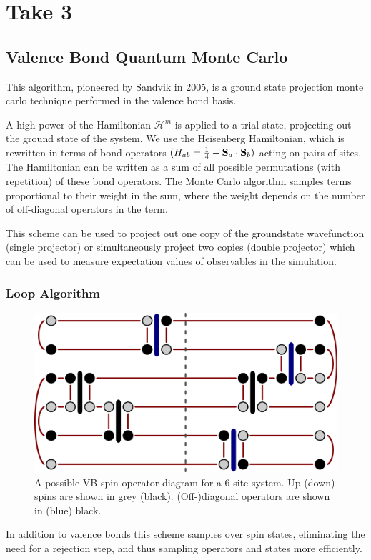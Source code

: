 \documentclass[prb,aps,twocolumn,floatfix,amsmath,amssymb,superscriptaddress,tightenlines]{revtex4}
\begin{document}
\section{Take 3}

\subsection{Valence Bond Quantum Monte Carlo}

This algorithm, pioneered by Sandvik \cite{papers} in 2005, is a ground state projection monte carlo technique performed in the valence bond basis.

A high power of the Hamiltonian $\mathcal{H}^m$ 
is applied to a trial state, projecting out the ground state of the system.
We use the Heisenberg Hamiltonian, which is rewritten in terms of bond operators $(H_{ab} = \tfrac{1}{4} - {\bf S}_a \cdot {\bf S}_b)$ acting on pairs of sites.
The Hamiltonian can be written as a sum of all possible {permutations (with repetition)} of these bond operators.
The Monte Carlo algorithm samples terms proportional to their weight in the sum, where the weight depends on the number of off-diagonal operators in the term.

This scheme can be used to project out one copy of the groundstate wavefunction (single projector) or simultaneously project two copies (double projector) which can be used to measure expectation values of observables in the simulation. 

\subsubsection{Loop Algorithm}

\begin{figure} {
\includegraphics[width=3 in]{loopalg.pdf} \caption{ A possible VB-spin-operator diagram for a 6-site system.
Up (down) spins are shown in grey (black). (Off-)diagonal operators are shown in (blue) black.
\label{loop1} }
} \end{figure}

In addition to valence bonds this scheme samples over spin states, eliminating the need for a rejection step, and thus sampling operators and states more efficiently.
\end{document}
